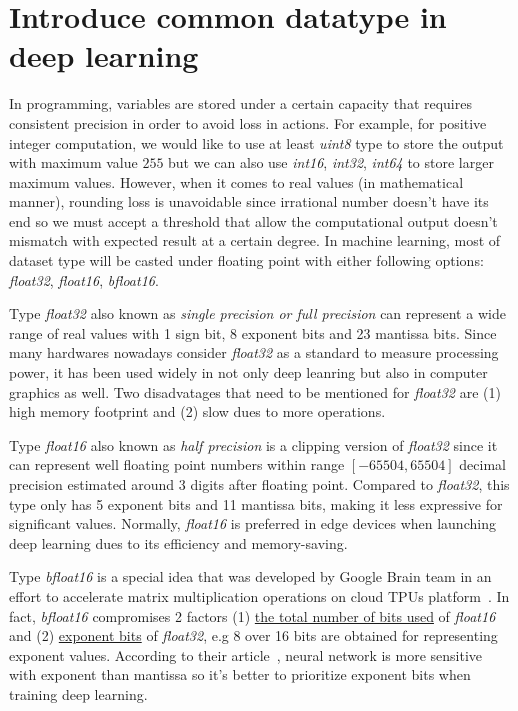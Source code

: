 \section{Introduce common datatype in deep learning}
In programming, variables are stored under a certain capacity that requires consistent precision in order to avoid loss in actions. For example, for positive integer computation, we would like to use at least \textit{uint8} type to store the output with maximum value $255$ but we can also use \textit{int16}, \textit{int32}, \textit{int64} to store larger maximum values. However, when it comes to real values (in mathematical manner), rounding loss is unavoidable since irrational number doesn't have its end so we must accept a threshold that allow the computational output doesn't mismatch with expected result at a certain degree. In machine learning, most of dataset type will be casted under floating point with either following options: \textit{float32}, \textit{float16}, \textit{bfloat16}.\newline

\noindent
Type \textit{float32} also known as \textit{single precision or full precision} can represent a wide range of real values with 1 sign bit, 8 exponent bits and 23 mantissa bits. Since many hardwares nowadays consider \textit{float32} as a standard to measure processing power, it has been used widely in not only deep leanring but also in computer graphics as well. Two disadvatages that need to be mentioned for \textit{float32} are (1) high memory footprint and (2) slow dues to more operations.\newline

\noindent
Type \textit{float16} also known as \textit{half precision} is a clipping version of \textit{float32} since it can represent well floating point numbers within range $[-65504,65504]$ decimal precision estimated around 3 digits after floating point. Compared to \textit{float32}, this type only has 5 exponent bits and 11 mantissa bits, making it less expressive for significant values. Normally, \textit{float16} is preferred in edge devices when launching deep learning dues to its efficiency and memory-saving.\newline 

\noindent
Type \textit{bfloat16} is a special idea that was developed by Google Brain team in an effort to accelerate matrix multiplication operations on cloud TPUs platform~\cite{bfloat}. In fact, \textit{bfloat16} compromises 2 factors (1) \ul{the total number of bits used} of \textit{float16} and (2) \ul{exponent bits} of \textit{float32}, e.g 8 over 16 bits are obtained for representing exponent values. According to their article~\cite{bfloat}, neural network is more sensitive with exponent than mantissa so it's better to prioritize exponent bits when training deep learning.

